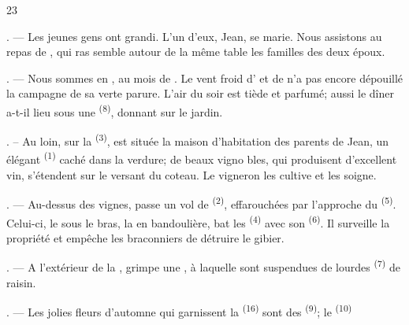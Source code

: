 \begin{VUpage}[25]{23}
\VUsaut{4.0mm}
\VUsaut{1.6mm}
\VUsaut{3.2mm}

\VUsaut{1.6mm}
\VUsaut{3.0mm}

. --- Les jeunes gens ont grandi. L'un d'eux, Jean,\nl
se marie. Nous assistons au repas de , qui ras\cc
semble autour de la même table les familles des deux\nl
époux.

. --- Nous sommes en , au mois de \cc
{}. Le vent froid d' et de \nl
n'a pas encore dépouillé la campagne de sa verte\nl
parure. L'air du soir est tiède et parfumé; aussi le\nl
dîner a-t-il lieu sous une  \textsuperscript{(8)}, donnant sur le\nl
jardin.

. -- Au loin, sur la  \textsuperscript{(3)}, est située la\nl
maison d'habitation des parents de Jean, un élégant\nl
{} \textsuperscript{(1)} caché dans la verdure; de beaux vigno\cc
bles, qui produisent d'excellent vin, s'étendent sur le\nl
versant du coteau. Le vigneron les cultive et les\nl
soigne.

. --- Au-dessus des vignes, passe un vol de \cc
{} \textsuperscript{(2)}, effarouchées par l'approche du \cc
{} \textsuperscript{(5)}. Celui-ci, le  sous le bras, la \cc
{} en bandoulière, bat les  \textsuperscript{(4)} avec son\nl
{} \textsuperscript{(6)}. Il surveille la propriété et empêche les\nl
braconniers de détruire le gibier.

. --- A l'extérieur de la , grimpe une\nl
{}, à laquelle sont suspendues de lourdes\nl
{} \textsuperscript{(7)} de raisin.

. --- Les jolies fleurs d'automne qui garnissent la\nl
{} \textsuperscript{(16)} sont des  \textsuperscript{(9)}; le  \textsuperscript{(10)}
\parplein
\end{VUpage}


